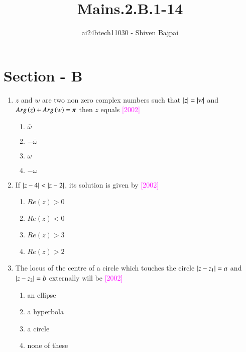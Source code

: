 \documentclass[journal,12pt,twocolumn]{IEEEtran}
\theoremstyle{remark}
\begin{document}

\vspace{3cm}

\title{Mains.2.B.1-14}
\author{ai24btech11030 - Shiven Bajpai}
\maketitle
\newpage
\bigskip

\renewcommand{\thefigure}{\theenumi}
\renewcommand{\thetable}{\theenumi}

\section*{Section - B}

\begin{enumerate}
	\item{$z$ and $w$ are two non zero complex numbers such that $\left\vert z\right\vert = \left\vert w\right\vert$ and $Arg\left(z\right) + Arg\left(w\right) = \pi$ then $z$ equals \hfill{\textcolor{magenta}{[2002]}}
		\begin{multicols}{4}
		\begin{enumerate}
			\item{$\overline{\omega}$} \columnbreak \item{$-\overline{\omega}$} \columnbreak \item{$\omega$} \columnbreak \item{$-\omega$}
		\end{enumerate}
		\end{multicols}
		}
		
	\item{If $\left\vert z-4\right\vert<\left\vert z-2\right\vert$, its solution is given by \hfill{\textcolor{magenta}{[2002]}}
		\begin{multicols}{2}
		\begin{enumerate}
			\item{$Re(z)>0$} 
			\item{$Re(z)<0$}
			\columnbreak
			\item{$Re(z)>3$}
			\item{$Re(z)>2$}
		\end{enumerate}
		\end{multicols}}
		
	\item{The locus of the centre of a circle which touches the circle $\left\vert z-z_1\right\vert=a$ and $\left\vert z-z_2\right\vert=b$ externally  will be \hfill{\textcolor{magenta}{[2002]}}
		\begin{multicols}{2}
		\begin{enumerate}
			\item{an ellipse}
			\item{a hyperbola} 
			\columnbreak
			\item{a circle}
			\item{none of these}
		\end{enumerate}
		\end{multicols}}
		

\end{enumerate}
\end{document}
